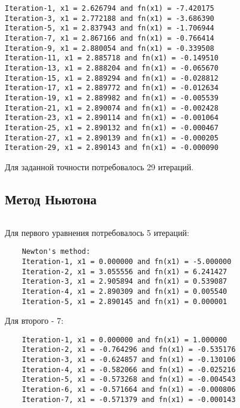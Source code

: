 \documentclass[../main.tex]{subfiles}
\begin{document}
\bigskip
\begin{tiny}
\begin{verbatim}
Iteration-1, x1 = 2.626794 and fn(x1) = -7.420175
Iteration-3, x1 = 2.772188 and fn(x1) = -3.686390
Iteration-5, x1 = 2.837943 and fn(x1) = -1.706944
Iteration-7, x1 = 2.867166 and fn(x1) = -0.766414
Iteration-9, x1 = 2.880054 and fn(x1) = -0.339508
Iteration-11, x1 = 2.885718 and fn(x1) = -0.149510
Iteration-13, x1 = 2.888204 and fn(x1) = -0.065670
Iteration-15, x1 = 2.889294 and fn(x1) = -0.028812
Iteration-17, x1 = 2.889772 and fn(x1) = -0.012634
Iteration-19, x1 = 2.889982 and fn(x1) = -0.005539
Iteration-21, x1 = 2.890074 and fn(x1) = -0.002428
Iteration-23, x1 = 2.890114 and fn(x1) = -0.001064
Iteration-25, x1 = 2.890132 and fn(x1) = -0.000467
Iteration-27, x1 = 2.890139 and fn(x1) = -0.000205
Iteration-29, x1 = 2.890143 and fn(x1) = -0.000090
\end{verbatim}
\end{tiny}

Для заданной точности потребовалось 29 итераций.

\subsection{Метод Ньютона}

\bigskip
\inputminted[mathescape,frame=single,framesep=2mm,fontsize=\scriptsize,
label=newtons\_method.go
]{go}{
../numerical/newtons_method.go
}

Для первого уравнения потребовалось 5 итераций:

\begin{tiny}
\begin{verbatim}
    Newton's method:
    Iteration-1, x1 = 0.000000 and fn(x1) = -5.000000
    Iteration-2, x1 = 3.055556 and fn(x1) = 6.241427
    Iteration-3, x1 = 2.905894 and fn(x1) = 0.539087
    Iteration-4, x1 = 2.890309 and fn(x1) = 0.005540
    Iteration-5, x1 = 2.890145 and fn(x1) = 0.000001
\end{verbatim}
\end{tiny}

\newpage
Для второго - 7:

\begin{tiny}
\begin{verbatim}
    Iteration-1, x1 = 0.000000 and fn(x1) = 1.000000
    Iteration-2, x1 = -0.764296 and fn(x1) = -0.535176
    Iteration-3, x1 = -0.624857 and fn(x1) = -0.130106
    Iteration-4, x1 = -0.582066 and fn(x1) = -0.025216
    Iteration-5, x1 = -0.573268 and fn(x1) = -0.004543
    Iteration-6, x1 = -0.571664 and fn(x1) = -0.000806
    Iteration-7, x1 = -0.571379 and fn(x1) = -0.000143
\end{verbatim}
\end{tiny}
\end{document}
